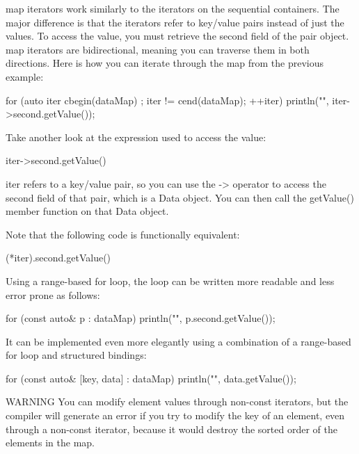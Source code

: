 
map iterators work similarly to the iterators on the sequential containers. The major difference is that the iterators refer to key/value pairs instead of just the values. To access the value, you must retrieve the second field of the pair object. map iterators are bidirectional, meaning you can traverse them in both directions. Here is how you can iterate through the map from the previous example:

\begin{cpp}
for (auto iter { cbegin(dataMap) }; iter != cend(dataMap); ++iter) {
    println("{}", iter->second.getValue());
}
\end{cpp}

Take another look at the expression used to access the value:

\begin{cpp}
iter->second.getValue()
\end{cpp}

iter refers to a key/value pair, so you can use the -> operator to access the second field of that pair, which is a Data object. You can then call the getValue() member function on that Data object.

Note that the following code is functionally equivalent:

\begin{cpp}
(*iter).second.getValue()
\end{cpp}

Using a range-based for loop, the loop can be written more readable and less error prone as follows:

\begin{cpp}
for (const auto& p : dataMap) {
    println("{}", p.second.getValue());
}
\end{cpp}

It can be implemented even more elegantly using a combination of a range-based for loop and structured bindings:

\begin{cpp}
for (const auto& [key, data] : dataMap) {
    println("{}", data.getValue());
}
\end{cpp}

\begin{myWarning}{WARNING}
You can modify element values through non-const iterators, but the compiler will generate an error if you try to modify the key of an element, even through a non-const iterator, because it would destroy the sorted order of the elements in the map.
\end{myWarning}

